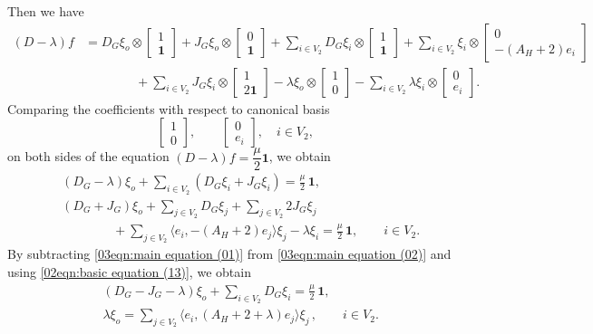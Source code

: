 \documentclass[pdflatex,sn-mathphys-num]{sn-jnl}
\theoremstyle{thmstyleone}%
\theoremstyle{thmstyletwo}%
\theoremstyle{thmstylethree}%
\begin{document}
Then we have
\begin{align*}
(D-\lambda)f&=D_G\xi_o\otimes \begin{bmatrix} 1 \\ \mathbf{1} \end{bmatrix}
 +J_G\xi_o\otimes \begin{bmatrix} 0 \\ \mathbf{1} \end{bmatrix}
 +\sum_{i\in V_2} 
  D_G\xi_i\otimes \begin{bmatrix} 1 \\ \mathbf{1} \end{bmatrix}
 +\sum_{i\in V_2} 
  \xi_i\otimes \begin{bmatrix} 0 \\ -(A_H+2)e_i \end{bmatrix} 
\\
&\qquad \qquad
 +\sum_{i\in V_2} 
  J_G\xi_i\otimes \begin{bmatrix} 1 \\ 2\mathbf{1} \end{bmatrix}
-\lambda \xi_o\otimes \begin{bmatrix} 1 \\ 0 \end{bmatrix}
-\sum_{i\in V_2} 
  \lambda \xi_i\otimes \begin{bmatrix} 0 \\ e_i \end{bmatrix}.
\end{align*}
Comparing the coefficients with respect to canonical basis
\[\begin{bmatrix}
1\\0
\end{bmatrix}, \qquad \begin{bmatrix}
0\\ e_i
\end{bmatrix}, \quad i\in V_2,\]
on both sides of the equation $(D-\lambda)f=\dfrac{\mu}{2}\mathbf{1}$, we obtain
\begin{align}
&(D_G-\lambda)\xi_o 
+\sum_{i\in V_2}(D_G\xi_i+J_G\xi_i)=\frac{\mu}{2}\,\mathbf{1},
\label{03eqn:main equation (01)}\\
&(D_G+J_G)\xi_o 
+\sum_{j\in V_2}D_G\xi_j
+\sum_{j\in V_2}2J_G\xi_j
\nonumber \\
&\qquad\qquad +\sum_{j\in V_2} \langle e_i, -(A_H+2)e_j\rangle \xi_j
-\lambda\xi_i
=\frac{\mu}{2}\,\mathbf{1},
\qquad i\in V_2.
\label{03eqn:main equation (02)} 
\end{align}
By subtracting \eqref{03eqn:main equation (01)} from \eqref{03eqn:main equation (02)} and using \eqref{02eqn:basic equation (13)}, we obtain
\begin{align}
&(D_G-J_G-\lambda)\xi_o 
+\sum_{i\in V_2}D_G\xi_i=\frac{\mu}{2}\,\mathbf{1},
\label{02eqn:basic equation (11)}
\\
&\lambda\xi_o
=\sum_{j\in V_2} \langle e_i, (A_H+2+\lambda)e_j\rangle \xi_j\,,
\qquad i\in V_2.
\label{02eqn:basic equation (12)}
\end{align}
\end{document}
